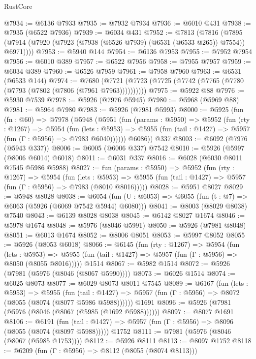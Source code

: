 \begin{lexlean}{RustCore}
\begin{coremodule}
@7934 := @6136 @7933
@7935 := @7932 @7934
@7936 := @6010 @431
@7938 := @7935 (@6522 @7936)
@7939 := @6034 @431
@7952 := @7813
    (@7816 (@7895 (@7914 (@7920 (@7923 (@7938 (@6526 @7939) (@6531 (@6533 @265)) @7554)) @6971))))
@7953 := @5940 @144
@7954 := @6136 @7953
@7955 := @7952 @7954
@7956 := @6010 @389
@7957 := @6522 @7956
@7958 := @7955 @7957
@7959 := @6034 @389
@7960 := @6526 @7959
@7961 := @7958 @7960
@7963 := @6531 (@6533 @144)
@7974 := @7680 (@7721 (@7723 (@7725 (@7742 (@7765 (@7780 (@7793 (@7802 (@7806 (@7961 @7963))))))))))
@7975 := @5922 @88
@7976 := @5930 @7539
@7978 := @5926 (@7976 @5945)
@7980 := @5968 (@5969 @88)
@7981 := @5964 @7980
@7983 := @5926 (@7981 @5993)
@8000 := @5925
    (fun (fn : @60) =>
    @7978
      (@5948
        (@5951
          (fun (params : @5950) =>
          @5952
            (fun (rty : @1267) =>
            @5954
              (fun (lets : @5953) =>
              @5955 (fun (tail : @1427) => @5957 (fun (Γ : @5956) => @7983 @6040))))))
        @6086))
    @337
@8003 := @6092 (@7976 (@5943 @337))
@8006 := @6005 (@6006 @337) @7542
@8010 := @5926 (@5997 (@8006 @6014) @6018)
@8011 := @6031 @337
@8016 := @6028 (@6030 @8011 @7545 @5986 @5988)
@8027 := fun (params : @5950) =>
  @5952
    (fun (rty : @1267) =>
    @5954
      (fun (lets : @5953) =>
      @5955 (fun (tail : @1427) => @5957 (fun (Γ : @5956) => @7983 (@8010 @8016)))))
@8028 := @5951 @8027
@8029 := @5948 @8028
@8038 := @6054 (fun (U : @6053) => @6055 (fun (t : @7) => @6063 (@5926 (@6069 @7542 @5944) @6080)))
@8041 := @8003 (@8029 @8038) @7540
@8043 := @6139 @8028 @8038
@8045 := @6142 @8027 @1674
@8046 := @5978 @1674
@8048 := @5976 (@8046 @5991)
@8050 := @5926 (@7981 @8048)
@8051 := @6013 @1674
@8052 := @8006 @8051
@8053 := @5997 @8052
@8055 := @5926 (@8053 @6018)
@8066 := @6145
    (fun (rty : @1267) =>
    @5954
      (fun (lets : @5953) =>
      @5955 (fun (tail : @1427) => @5957 (fun (Γ : @5956) => @8050 (@8055 @8016)))))
    @1514
@8067 := @5982 @1514
@8072 := @5926 (@7981 (@5976 (@8046 (@8067 @5990))))
@8073 := @6026 @1514
@8074 := @6025 @8073
@8077 := @6029 @8073 @8011 @7545
@8089 := @6167
    (fun (lets : @5953) =>
    @5955
      (fun (tail : @1427) => @5957 (fun (Γ : @5956) => @8072 (@8055 (@8074 (@8077 @5986 @5988))))))
    @1691
@8096 := @5926 (@7981 (@5976 (@8046 (@8067 (@5985 (@1692 @5988))))))
@8097 := @8077 @1691
@8106 := @6191
    (fun (tail : @1427) => @5957 (fun (Γ : @5956) => @8096 (@8055 (@8074 (@8097 @5988)))))
    @1752
@8111 := @7981 (@5976 (@8046 (@8067 (@5985 @1753))))
@8112 := @5926 @8111
@8113 := @8097 @1752
@8118 := @6209 (fun (Γ : @5956) => @8112 (@8055 (@8074 @8113)))

\end{coremodule}
\end{lexlean}
